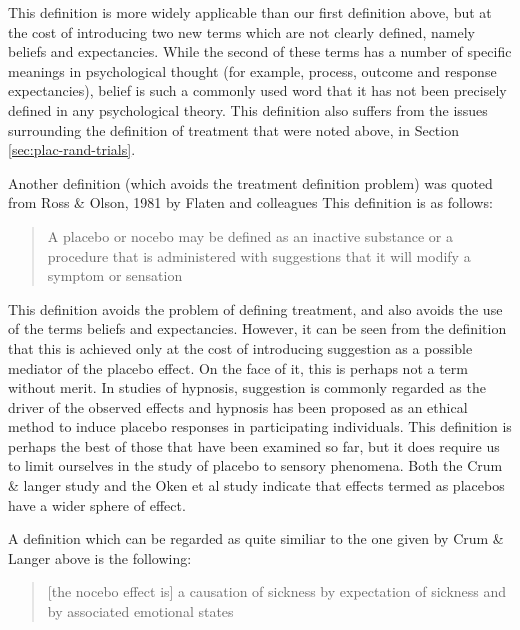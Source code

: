This definition is more widely applicable than our first definition above, but at the cost of introducing two new terms which are not clearly defined, namely beliefs and expectancies. While the second of these terms has a number of specific meanings in psychological thought (for example, process, outcome and response expectancies), belief is such a commonly used word that it has not been precisely defined in any psychological theory. This definition also suffers from the issues surrounding the definition of treatment that were noted above, in Section \ref{sec:plac-rand-trials}. 


Another definition (which avoids the treatment definition problem) was quoted from Ross \& Olson, 1981 by Flaten and colleagues \cite{Flaten1999}
This definition is as follows:

\begin{quotation}
  A placebo or nocebo may be defined as an inactive
substance or a procedure that is administered with
suggestions that it will modify a symptom or sensation
\end{quotation}

This definition avoids the problem of defining treatment, and also avoids the use of the terms beliefs and expectancies. However, it can be seen from the definition that this is achieved only at the cost of introducing suggestion as a possible mediator of the placebo effect. On the face of it, this is perhaps not a term without merit. In studies of hypnosis, suggestion is commonly regarded as the driver of the observed effects \cite{Kirsch1994} and hypnosis has been proposed as an ethical method to induce placebo responses in participating individuals. This definition is perhaps the best of those that have been examined so far, but it does require us to limit ourselves in the study of placebo to sensory phenomena. Both the Crum \& langer study and the Oken et al study indicate that effects termed as placebos have a wider sphere of effect. 

A definition which can be regarded as quite similiar to the one given by Crum \& Langer above is the following:
\begin{quotation}
[the nocebo effect is]  a causation of sickness by expectation of sickness and by associated emotional states
\end{quotation}

